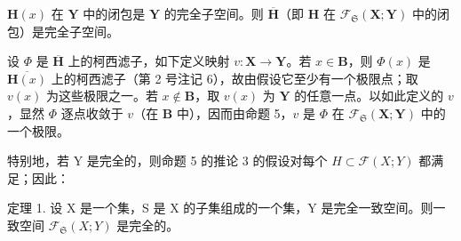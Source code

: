 \(\mathbf{H}(x)\) 在 \(\mathbf{Y}\) 中的闭包是 \(\mathbf{Y}\) 的完全子空间。则 \(\overline{\mathbf{H}}\)（即 \(\mathbf{H}\) 在 \(\mathcal{F}_{\mathfrak{S}}(\mathbf{X};\mathbf{Y})\) 中的闭包）是完全子空间。

设 \(\Phi\) 是 \(\overline{\mathbf{H}}\) 上的柯西滤子，如下定义映射 \(v: \mathbf{X} \to \mathbf{Y}\)。若 \(x \in \mathbf{B}\)，则 \(\Phi(x)\) 是 \(\overline{\mathbf{H}(x)}\) 上的柯西滤子（第 2 号注记 6），故由假设它至少有一个极限点；取 \(v(x)\) 为这些极限之一。若 \(x \notin \mathbf{B}\)，取 \(v(x)\) 为 \(\mathbf{Y}\) 的任意一点。以如此定义的 \(v\)，显然 \(\Phi\) 逐点收敛于 \(v\)（在 \(\mathbf{B}\) 中），因而由命题 5，\(v\) 是 \(\Phi\) 在 \(\mathcal{F}_{\mathfrak{S}}(\mathbf{X}; \mathbf{Y})\) 中的一个极限。

特别地，若 Y 是完全的，则命题 5 的推论 3 的假设对每个 \(H \subset \mathcal{F}(X; Y)\) 都满足；因此：

定理 1. 设 X 是一个集，S 是 X 的子集组成的一个集，Y 是完全一致空间。则一致空间 \(\mathcal{F}_{\mathfrak{S}}(X;Y)\) 是完全的。

